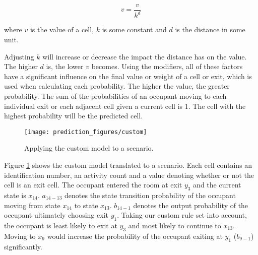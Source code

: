 \begin{equation}
	v = \frac{v}{k^d}
\end{equation}

where \(v\) is the value of a cell, \(k\) is some constant and \(d\) is the distance in some unit.
 
Adjusting \(k\) will increase or decrease the impact the distance has on the value. The higher \(d\) is, the lower \(v\) becomes. Using the modifiers, all of these factors have a significant influence on the final value or weight of a cell or exit, which is used when calculating each probability. The higher the value, the greater probability. The sum of the probabilities of an occupant moving to each individual exit or each adjacent cell given a current cell is 1. The cell with the highest probability will be the predicted cell.

\begin{figure}[htb]
	\centering
	\texttt{[image: prediction\_figures/custom]}
	\caption{Applying the custom model to a scenario.}
	\label{fig:custom_model}
\end{figure}

Figure \ref{fig:custom_model} shows the custom model translated to a scenario. Each cell contains an identification number, an activity count and a value denoting whether or not the cell is an exit cell. The occupant entered the room at exit \(y_3\) and the current state is \(x_{14}\). \(a_{14-13}\) denotes the state transition probability of the occupant moving from state \(x_{14}\) to state \(x_{13}\). \(b_{14-1}\) denotes the output probability of the occupant ultimately choosing exit \(y_{1}\). Taking our custom rule set into account, the occupant is least likely to exit at \(y_3\) and most likely to continue to \(x_{13}\). Moving to \(x_9\) would increase the probability of the occupant exiting at \(y_{1}\) (\(b_{9-1}\)) significantly.